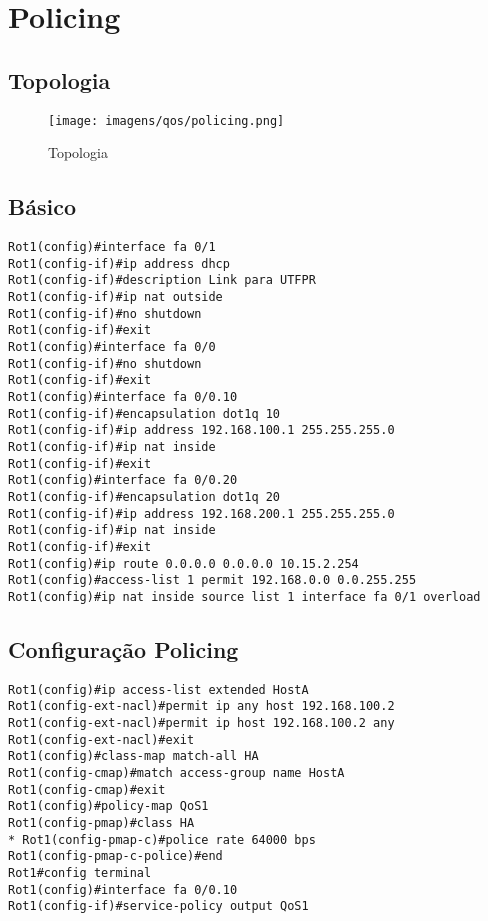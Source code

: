 \documentclass[]{article}
\begin{document}
\section{Policing}\label{policing}

\subsection{Topologia}\label{topologia}

\begin{figure}[htbp]
\centering
\texttt{[image: imagens/qos/policing.png]}
\caption{Topologia}
\end{figure}

\subsection{Básico}\label{buxe1sico}

\begin{verbatim}
Rot1(config)#interface fa 0/1
Rot1(config-if)#ip address dhcp
Rot1(config-if)#description Link para UTFPR
Rot1(config-if)#ip nat outside
Rot1(config-if)#no shutdown
Rot1(config-if)#exit
Rot1(config)#interface fa 0/0
Rot1(config-if)#no shutdown
Rot1(config-if)#exit
Rot1(config)#interface fa 0/0.10
Rot1(config-if)#encapsulation dot1q 10
Rot1(config-if)#ip address 192.168.100.1 255.255.255.0
Rot1(config-if)#ip nat inside
Rot1(config-if)#exit
Rot1(config)#interface fa 0/0.20
Rot1(config-if)#encapsulation dot1q 20
Rot1(config-if)#ip address 192.168.200.1 255.255.255.0
Rot1(config-if)#ip nat inside
Rot1(config-if)#exit
Rot1(config)#ip route 0.0.0.0 0.0.0.0 10.15.2.254
Rot1(config)#access-list 1 permit 192.168.0.0 0.0.255.255
Rot1(config)#ip nat inside source list 1 interface fa 0/1 overload
\end{verbatim}

\subsection{Configuração Policing}\label{configurauxe7uxe3o-policing}

\begin{verbatim}
Rot1(config)#ip access-list extended HostA
Rot1(config-ext-nacl)#permit ip any host 192.168.100.2
Rot1(config-ext-nacl)#permit ip host 192.168.100.2 any
Rot1(config-ext-nacl)#exit
Rot1(config)#class-map match-all HA
Rot1(config-cmap)#match access-group name HostA
Rot1(config-cmap)#exit
Rot1(config)#policy-map QoS1
Rot1(config-pmap)#class HA
* Rot1(config-pmap-c)#police rate 64000 bps
Rot1(config-pmap-c-police)#end
Rot1#config terminal
Rot1(config)#interface fa 0/0.10
Rot1(config-if)#service-policy output QoS1
\end{verbatim}
\end{document}
